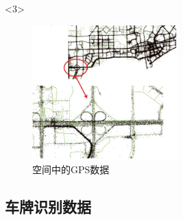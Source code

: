 \documentclass{beamerthemeMono}
\begin{document}
\begin{frame}[t]{\subsecname}
\begin{overlayarea}{\textwidth}{\textheight}
\vspace{-5pt}
  \begin{onlyenv}<3>
\begin{figure}
  \centering
  \includegraphics[width=0.5\textwidth]{chp02_空间上的GPS数据.jpg}
  \caption{空间中的GPS数据}
\end{figure}
  \end{onlyenv}
\end{overlayarea}
\end{frame}

\subsection{车牌识别数据}
\end{document}

